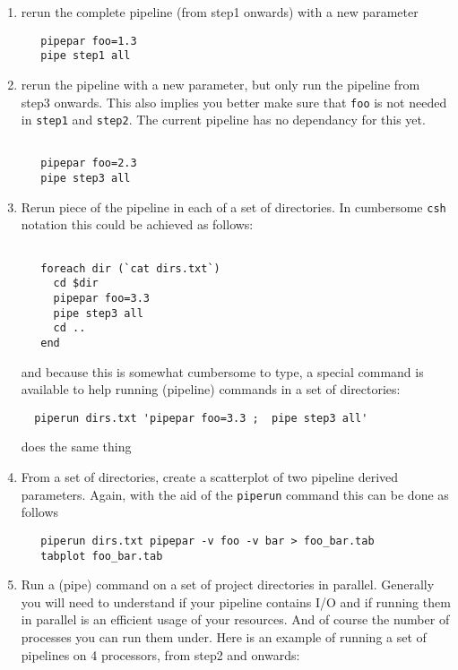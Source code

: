 \documentclass[preprint]{aastex} %
\begin{document}
\begin{enumerate}

\item
rerun the complete pipeline (from step1 onwards) with a new parameter

\footnotesize
\begin{verbatim}
   pipepar foo=1.3
   pipe step1 all
\end{verbatim}
\normalsize

\item
rerun the pipeline with a new parameter, but only run the pipeline
from step3 onwards. This also implies you better make sure that {\tt foo}
is not needed in {\tt step1} and {\tt step2}. The current pipeline
has no dependancy for this yet.

\footnotesize
\begin{verbatim}

   pipepar foo=2.3
   pipe step3 all
\end{verbatim}
\normalsize


\item
Rerun piece of the pipeline in each of
a set of directories. In cumbersome {\tt csh} notation this 
could be achieved as follows:
\footnotesize
\begin{verbatim}

   foreach dir (`cat dirs.txt`)
     cd $dir
     pipepar foo=3.3
     pipe step3 all
     cd ..
   end
\end{verbatim}
\normalsize


and because this is somewhat cumbersome to type, a special command is 
available to help running (pipeline) commands in a set of directories:

\footnotesize
\begin{verbatim}
  piperun dirs.txt 'pipepar foo=3.3 ;  pipe step3 all'
\end{verbatim}
\normalsize

does the same thing

\item
From a set of directories, create a scatterplot of two pipeline
derived parameters. Again, with the aid of
the {\tt piperun} command this can be done as follows

\footnotesize
\begin{verbatim}
   piperun dirs.txt pipepar -v foo -v bar > foo_bar.tab
   tabplot foo_bar.tab
\end{verbatim}
\normalsize

\item
Run a (pipe) command on a set of project directories in parallel. Generally
you will need to understand if your pipeline contains I/O and if running
them in parallel is an efficient usage of your resources. And of course
the number of processes you can run them under. Here is an example
of running a set of pipelines on 4 processors, from step2 and onwards:


\end{enumerate}
\end{document}
